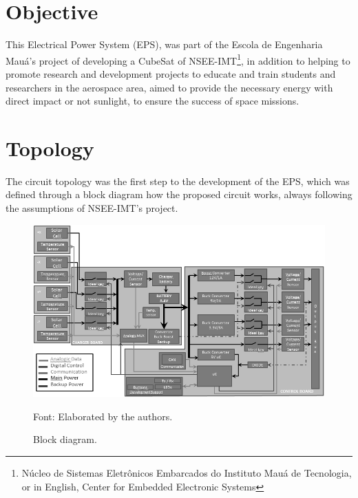 \documentclass[3p]{elsarticle}
\begin{document}

\section{Objective}
\label{Objective}

	This Electrical Power System (EPS), was part of the Escola de Engenharia Mau\'{a}'s project of developing a CubeSat of NSEE-IMT\footnote{N\'{u}cleo de Sistemas Eletr\^{o}nicos Embarcados do Instituto Mau\'{a} de Tecnologia, or in English, Center for Embedded Electronic Systems}, in addition to helping to promote research and development projects to educate and train students and researchers in the aerospace area, aimed to provide the necessary energy with direct impact or not sunlight, to ensure the success of space missions.
	
\section{Topology}
\label{Topologia}

	The circuit topology was the first step to the development of the EPS, which was defined through a block diagram how the proposed circuit works, always following the assumptions of NSEE-IMT's project.\cite{Corsi}

	\begin{figure}[th]
		\label{Fig_diag}
		\centering
		\includegraphics[width=0.8\linewidth]{./figs/diag}
		\caption{Block diagram.}
		\begin{footnotesize}
		Font: Elaborated by the authors.
		\end{footnotesize}
	\end{figure}
	
	
	
\end{document}

